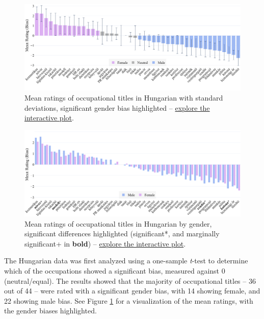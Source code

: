 \documentclass[11pt]{article}
\begin{document}
\begin{figure}[!ht]
  \centering
  \includegraphics[width=\linewidth]{../occupations_hu}
  \caption{Mean ratings of occupational titles in Hungarian with standard deviations, significant gender bias highlighted -- \href{https://htmlpreview.github.io/?https://https://anonymous.4open.science/r/occupational-bias-paclic39/occupations_hu.html}{explore the interactive plot}.}
  \label{fig:occupations_hu}
\end{figure}

\begin{figure}[tbp]
  \centering
  \includegraphics[width=\linewidth]{../occupations_hu_gender}
  \caption{Mean ratings of occupational titles in Hungarian by gender, significant differences highlighted (significant*, and marginally significant+ in \textbf{bold}) -- \href{https://htmlpreview.github.io/?https://github.com/partigabor/occupational-bias/blob/main/occupations_hu_gender.html}{explore the interactive plot}.}
  \label{fig:occupations_hu_gender}
\end{figure}


The Hungarian data was first analyzed using a one-sample \textit{t}-test to determine which of the occupations showed a significant bias, measured against 0 (neutral/equal). The results showed that the majority of occupational titles -- 36 out of 44 -- were rated with a significant gender bias, with 14 showing female, and 22 showing male bias. See Figure \ref{fig:occupations_hu} for a visualization of the mean ratings, with the gender biases highlighted.
\end{document}
